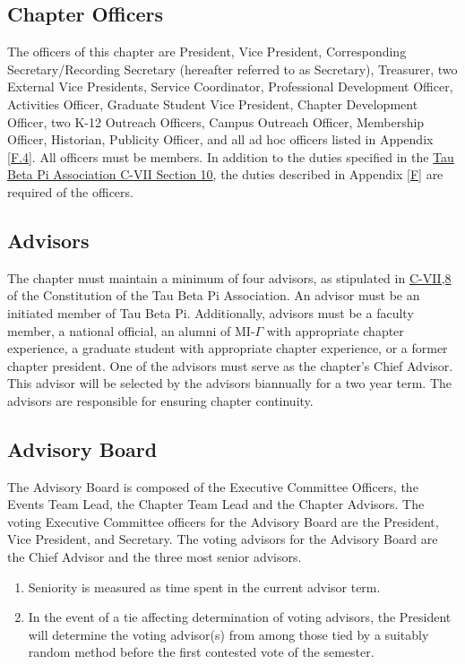 \subsection{Chapter Officers} \label{I.1}

The officers of this chapter are President, Vice President,
Corresponding Secretary/Recording Secretary (hereafter referred to as Secretary),
Treasurer, two External Vice Presidents, Service Coordinator, Professional Development
Officer, Activities Officer, Graduate Student Vice President, Chapter Development Officer,
two K-12 Outreach Officers, Campus Outreach Officer, Membership Officer, Historian,
Publicity Officer, and all ad hoc officers listed in Appendix \ref{F.4}. All officers must be members.
In addition to the duties specified in the \href{http://www.tbp.org/off/ConstBylaw.pdf}{Tau Beta Pi Association C-VII Section 10}, the
duties described in Appendix \ref{F} are required of the officers.


\subsection{Advisors} \label{I.2}

The chapter must maintain a minimum of four advisors, as stipulated
in \href{http://www.tbp.org/off/ConstBylaw.pdf}{C-VII,8} of the Constitution of the Tau Beta Pi Association. An advisor must be an
initiated member of Tau Beta Pi. Additionally, advisors must be a faculty member, a national
official, an alumni of MI-$\Gamma$ with appropriate chapter experience, a graduate student
with appropriate chapter experience, or a former chapter president. One of the advisors
must serve as the chapter’s Chief Advisor. This advisor will be selected by the advisors
biannually for a two year term. The advisors are responsible for ensuring chapter continuity.


\subsection{Advisory Board} \label{I.3}

The Advisory Board is composed of the Executive Committee Officers, the Events Team Lead, the Chapter Team Lead
and the Chapter Advisors. The voting Executive Committee officers for the Advisory
Board are the President, Vice President, and Secretary. The voting advisors for the
Advisory Board are the Chief Advisor and the three most senior advisors.
\begin{enumerate}
    \item Seniority is measured as time spent in the current advisor term.
    \item In the event of a tie affecting determination of voting advisors, the President will
determine the voting advisor(s) from among those tied by a suitably random method
before the first contested vote of the semester.
\end{enumerate}


